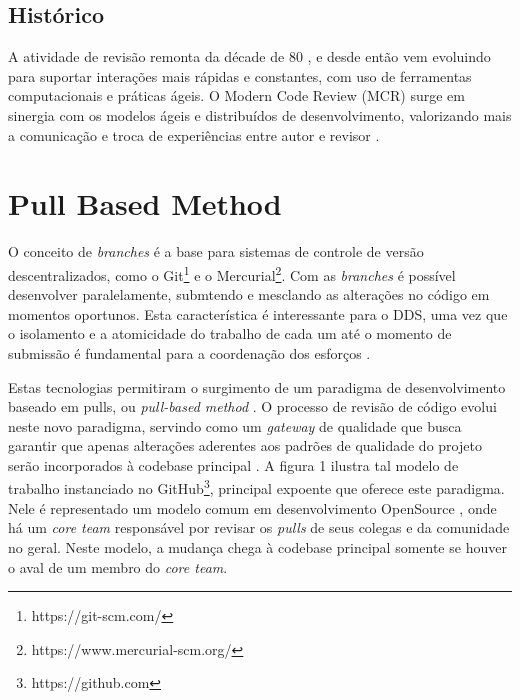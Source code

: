 \documentclass[a4paper,12pt]{monografia}
\theoremstyle{plain}
\theoremstyle{definition}
\theoremstyle{remark}
\begin{document}
\subsection{Histórico}\label{sec:historico}
  A atividade de revisão remonta da décade de 80 \cite{Fagan1976}, e desde então vem evoluindo para suportar interações mais rápidas e constantes, com uso de ferramentas computacionais e práticas ágeis. O Modern Code Review (MCR) surge em sinergia com os modelos ágeis e distribuídos de desenvolvimento, valorizando mais a comunicação e troca de experiências entre autor e revisor \cite{Bacchelli2013}.

\section{Pull Based Method}\label{sec:pull_based}
  O conceito de \textit{branches} é a base para sistemas de controle de versão descentralizados, como o  Git\footnote{https://git-scm.com/} e o Mercurial\footnote{https://www.mercurial-scm.org/}. Com as \textit{branches} é possível desenvolver paralelamente, submtendo e mesclando as alterações no código em momentos oportunos. Esta característica é interessante para o DDS, uma vez que o isolamento e a atomicidade do trabalho de cada um até o momento de submissão é fundamental para a coordenação dos esforços \cite{barr2012}.

  Estas tecnologias permitiram o surgimento de um paradigma de desenvolvimento baseado em pulls, ou \textit{pull-based method} \cite{gousios2014}. O processo de revisão de código evolui neste novo paradigma, servindo como um \textit{gateway} de qualidade que busca garantir que apenas alterações aderentes aos padrões de qualidade do projeto serão incorporados à codebase principal \cite{gousios2015}. A figura 1 ilustra tal modelo de trabalho instanciado no GitHub\footnote{https://github.com}, principal expoente que oferece este paradigma. Nele é representado um modelo comum em desenvolvimento OpenSource \cite{6385140}, onde há um \textit{core team} responsável por revisar os \textit{pulls} de seus colegas e da comunidade no geral. Neste modelo, a mudança chega à codebase principal somente se houver o aval de um membro do \textit{core team}.
\end{document}
